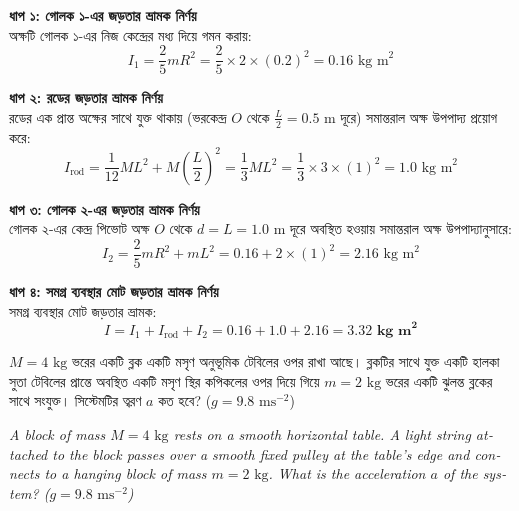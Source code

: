 \documentclass[12pt, a4paper]{article}
\begin{document}
\begin{tcolorbox}[solutionbox={সমাধান (Solution)}]
\noindent
\textbf{ধাপ ১: গোলক ১-এর জড়তার ভ্রামক নির্ণয়} \\
অক্ষটি গোলক ১-এর নিজ কেন্দ্রের মধ্য দিয়ে গমন করায়:
\[I_1 = \frac{2}{5}mR^2 = \frac{2}{5} \times 2 \times (0.2)^2 = 0.16\text{ kg m}^2\]

\vspace{0.5em}
\noindent\textbf{ধাপ ২: রডের জড়তার ভ্রামক নির্ণয়} \\
রডের এক প্রান্ত অক্ষের সাথে যুক্ত থাকায় (ভরকেন্দ্র $O$ থেকে $\frac{L}{2} = 0.5\text{ m}$ দূরে) সমান্তরাল অক্ষ উপপাদ্য প্রয়োগ করে:
\[I_{\text{rod}} = \frac{1}{12}ML^2 + M\left(\frac{L}{2}\right)^2 = \frac{1}{3}ML^2 = \frac{1}{3} \times 3 \times (1)^2 = 1.0\text{ kg m}^2\]

\vspace{0.5em}
\noindent\textbf{ধাপ ৩: গোলক ২-এর জড়তার ভ্রামক নির্ণয়} \\
গোলক ২-এর কেন্দ্র পিভোট অক্ষ $O$ থেকে $d = L = 1.0\text{ m}$ দূরে অবস্থিত হওয়ায় সমান্তরাল অক্ষ উপপাদ্যানুসারে:
\[I_2 = \frac{2}{5}mR^2 + mL^2 = 0.16 + 2 \times (1)^2 = 2.16\text{ kg m}^2\]

\vspace{0.5em}
\noindent\textbf{ধাপ ৪: সমগ্র ব্যবস্থার মোট জড়তার ভ্রামক নির্ণয়} \\
সমগ্র ব্যবস্থার মোট জড়তার ভ্রামক:
\[I = I_1 + I_{\text{rod}} + I_2 = 0.16 + 1.0 + 2.16 = \mathbf{3.32\text{ kg m}^2}\]
\end{tcolorbox}
\begin{tcolorbox}[questionbox={প্রশ্ন (Question) 12}]
    \noindent
    $M = 4\text{ kg}$ ভরের একটি ব্লক একটি মসৃণ অনুভূমিক টেবিলের ওপর রাখা আছে। ব্লকটির সাথে যুক্ত একটি হালকা সুতা টেবিলের প্রান্তে অবস্থিত একটি মসৃণ স্থির কপিকলের ওপর দিয়ে গিয়ে $m = 2\text{ kg}$ ভরের একটি ঝুলন্ত ব্লকের সাথে সংযুক্ত। সিস্টেমটির ত্বরণ $a$ কত হবে? ($g = 9.8\text{ ms}^{-2}$)
    
    \vspace{0.8em}
    \begin{english}
    \noindent\textit{\color{darkgray}
    A block of mass $M = 4\text{ kg}$ rests on a smooth horizontal table. A light string attached to the block passes over a smooth fixed pulley at the table's edge and connects to a hanging block of mass $m = 2\text{ kg}$. What is the acceleration $a$ of the system? ($g = 9.8\text{ ms}^{-2}$)
    }
    \end{english}
\end{tcolorbox}
\end{document}
